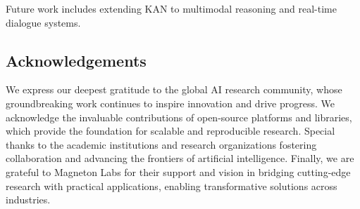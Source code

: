 \documentclass[11pt]{article}
\begin{document}
Future work includes extending KAN to multimodal reasoning and real-time dialogue systems.
\subsection*{Acknowledgements}
We express our deepest gratitude to the global AI research community, whose groundbreaking work continues to inspire innovation and drive progress. We acknowledge the invaluable contributions of open-source platforms and libraries, which provide the foundation for scalable and reproducible research. Special thanks to the academic institutions and research organizations fostering collaboration and advancing the frontiers of artificial intelligence. Finally, we are grateful to Magneton Labs for their support and vision in bridging cutting-edge research with practical applications, enabling transformative solutions across industries.
\end{document}
